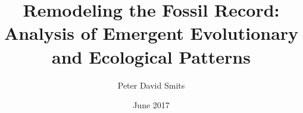 \documentclass{ucetd}  %
\title{Remodeling the Fossil Record: \protect\\Analysis of Emergent Evolutionary and Ecological Patterns}
\author{Peter David Smits}
\date{June 2017}
\begin{document}
\maketitle

\makecopyright
\makededication
\makeepigraph


\tableofcontents
\listoffigures
\listoftables

\acknowledgments

\abstract

\mainmatter











\makebibliography

%
%

\end{document}
